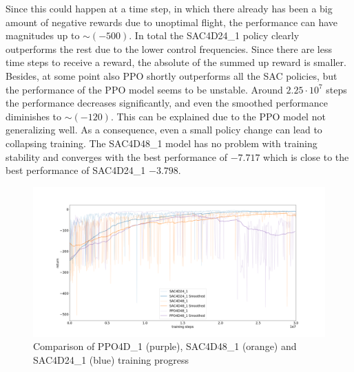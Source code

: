 Since this could happen at a time step, in which there already has been a 
big amount of negative rewards due to unoptimal flight, the performance can 
have magnitudes up to $\sim (-500)$.
In total the SAC4D24\_1 policy clearly outperforms the rest due to the lower
control frequencies. Since there are less time steps to receive a reward,
the absolute of the summed up reward is smaller.
Besides, at some point also PPO shortly outperforms all the SAC policies,
but the performance of the PPO model seems to be unstable.
Around $2.25 \cdot 10^7$ steps the performance decreases significantly, and
even the smoothed performance diminishes to $\sim (-120)$. 
This can be explained due to the PPO model not generalizing well. As a consequence,
even a small policy change can lead to collapsing training.
The SAC4D48\_1 model has no problem with training stability and converges with the best
performance of $-7.717$ which is close to the best performance of SAC4D24\_1 $-3.798$.

\begin{figure}
	\centering
	\includegraphics[width=\linewidth]{figures/4Dtrain.png}
	\caption{Comparison of PPO4D\_1 (purple), SAC4D48\_1 (orange) and SAC4D24\_1
	 (blue) training progress}
	\label{fig:train4D}
\end{figure}


